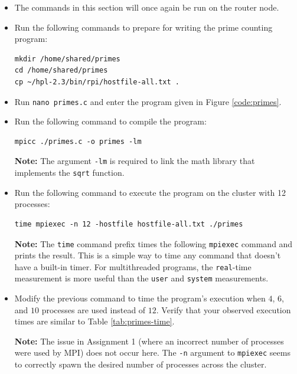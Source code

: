 \documentclass{article}
\begin{document}
\begin{itemize}
    \item The commands in this section will once again be run on the router node.
    
    \item Run the following commands to prepare for writing the prime counting program:
\begin{verbatim}
mkdir /home/shared/primes
cd /home/shared/primes
cp ~/hpl-2.3/bin/rpi/hostfile-all.txt .
\end{verbatim}

\item Run \texttt{nano primes.c} and enter the program given in Figure \ref{code:primes}.



\item Run the following command to compile the program:
\begin{verbatim}
mpicc ./primes.c -o primes -lm
\end{verbatim}

\textbf{Note:} The argument \texttt{-lm} is required to link the math library that implements the \texttt{sqrt} function.

\item Run the following command to execute the program on the cluster with 12 processes:
\begin{verbatim}
time mpiexec -n 12 -hostfile hostfile-all.txt ./primes
\end{verbatim}

\textbf{Note:} The \texttt{time} command prefix times the following \texttt{mpiexec} command and prints the result. This is a simple way to time any command that doesn't have a built-in timer. For multithreaded programs, the \texttt{real}-time measurement is more useful than the \texttt{user} and \texttt{system} measurements.

\item Modify the previous command to time the program's execution when $4$, $6$, and $10$ processes are used instead of $12$. Verify that your observed execution times are similar to Table \ref{tab:primes-time}.

\textbf{Note:} The issue in Assignment 1 (where an incorrect number of processes were used by MPI) does not occur here. The \texttt{-n} argument to \texttt{mpiexec} seems to correctly spawn the desired number of processes across the cluster.




\end{itemize}
\end{document}
